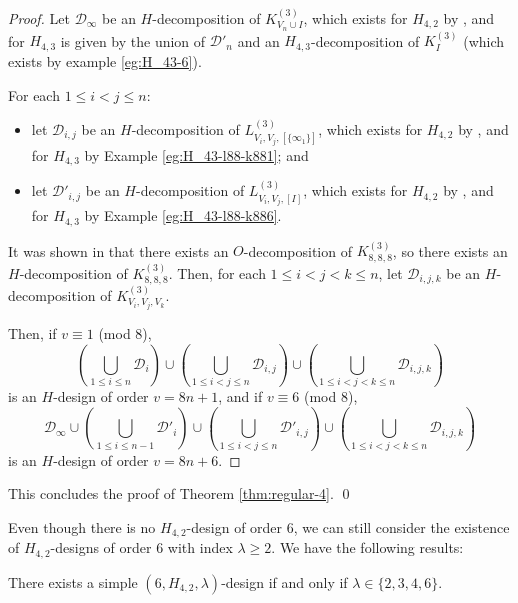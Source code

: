 \begin{proof}
Let $\mathcal{D}_\infty$ be an $H$-decomposition of $K_{V_n \cup I}^{(3)}$,
  which exists for $H_{4,2}$ by \cite{bryant}, and for $H_{4,3}$ is given by
  the union of $\mathcal{D}'_n$ and an $H_{4,3}$-decomposition of $K_{I}^{(3)}$ (which exists by example \ref{eg:H_43-6}).


For each $1 \leq i < j \leq n$:
\begin{itemize}
  \item let $\mathcal{D}_{i,j}$ be an $H$-decomposition of $L_{V_i,V_j,[\{\infty_1\}]}^{(3)}$, which exists for $H_{4,2}$ by \cite{bryant}, and for $H_{4,3}$ by Example \ref{eg:H_43-l88-k881}; and
  \item let $\mathcal{D}'_{i,j}$ be an $H$-decomposition of $L_{V_i,V_j,[I]}^{(3)}$, which exists for $H_{4,2}$ by \cite{bryant}, and for $H_{4,3}$ by Example \ref{eg:H_43-l88-k886}.
\end{itemize}

It was shown in \cite{hanani} that there exists an $O$-decomposition of $K_{8,8,8}^{(3)}$, so there exists an $H$-decomposition of $K_{8,8,8}^{(3)}$.
Then, for each $1 \leq i < j < k \leq n$, let $\mathcal{D}_{i,j,k}$ be an $H$-decomposition of $K_{V_i,V_j,V_k}^{(3)}$.

Then, if $v \equiv 1$ (mod 8),
\[
    \left( \bigcup_{1 \leq i \leq n} \mathcal{D}_i \right)
    \cup \left( \bigcup_{1 \leq i < j \leq n} \mathcal{D}_{i,j} \right)
    \cup \left( \bigcup_{1 \leq i < j < k \leq n} \mathcal{D}_{i,j,k} \right)
\]
is an $H$-design of order $v = 8n+1$, and if $v \equiv 6$ (mod 8),
\[
    \mathcal{D}_\infty \cup \left( \bigcup_{1 \leq i \leq n-1}
    \mathcal{D}'_i \right) \cup \left( \bigcup_{1 \leq i < j \leq n}
    \mathcal{D}'_{i,j} \right) \cup \left( \bigcup_{1
    \leq i < j < k \leq n} \mathcal{D}_{i,j,k} \right)
\]
is an $H$-design of order $v = 8n+6$.
\end{proof}

This concludes the proof of Theorem \ref{thm:regular-4}. \qed

Even though there is no $H_{4,2}$-design of order $6$, we can still consider the existence of $H_{4,2}$-designs of order $6$ with index $\lambda \geq 2$.
We have the following results:

\begin{theorem} \label{thm:H_42-6-simple}
There exists a simple $(6, H_{4,2}, \lambda)$-design if and only if $\lambda \in \{2, 3, 4, 6\}$.
\end{theorem}

